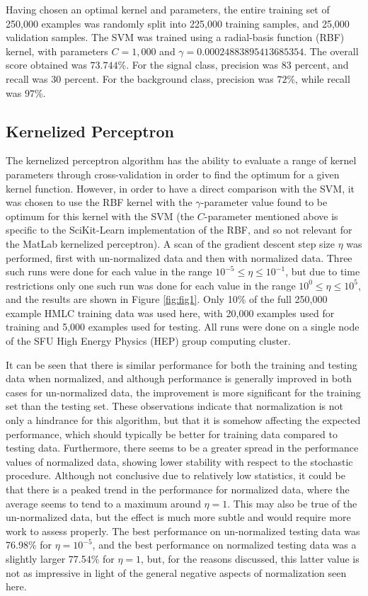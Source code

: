 \documentclass          {article} %
\begin{document}
Having chosen an optimal kernel and parameters, the entire training set of 250,000 examples was randomly split into 225,000 training samples, and 25,000 validation samples. The SVM was trained using a radial-basis function (RBF) kernel, with parameters $C=1,000$ and $\gamma=0.00024883895413685354$. The overall score obtained was $73.744$\%. For the signal class, precision was $83$ percent, and recall was $30$ percent. For the background class, precision was $72$\%, while recall was $97$\%.

            \subsection {Kernelized Perceptron}
            \label      {kernelized_perceptron}
The kernelized perceptron algorithm has the ability to evaluate a range of kernel parameters through cross-validation in order to find the optimum for a given kernel function. However, in order to have a direct comparison with the SVM, it was chosen to use the RBF kernel with the $\gamma$-parameter value found to be optimum for this kernel with the SVM (the $C$-parameter mentioned above is specific to the SciKit-Learn implementation of the RBF, and so not relevant for the MatLab kernelized perceptron). A scan of the gradient descent step size $\eta$ was performed, first with un-normalized data and then with normalized data. Three such runs were done for each value in the range $10^{-5}\le\eta\le10^{-1}$, but due to time restrictions only one such run was done for each value in the range $10^{0}\le\eta\le10^{5}$, and the results are shown in Figure \ref{fig:fig1}. Only 10\% of the full 250,000 example HMLC training data was used here, with 20,000 examples used for training and 5,000 examples used for testing. All runs were done on a single node of the SFU High Energy Physics (HEP) group computing cluster.

It can be seen that there is similar performance for both the training and testing data when normalized, and although performance is generally improved in both cases for un-normalized data, the improvement is more significant for the training set than the testing set. These observations indicate that normalization is not only a hindrance for this algorithm, but that it is somehow affecting the expected performance, which should typically be better for training data compared to testing data. Furthermore, there seems to be a greater spread in the performance values of normalized data, showing lower stability with respect to the stochastic procedure. Although not conclusive due to relatively low statistics, it could be that there is a peaked trend in the performance for normalized data, where the average seems to tend to a maximum around $\eta=1$. This may also be true of the un-normalized data, but the effect is much more subtle and would require more work to assess properly. The best performance on un-normalized testing data was 76.98\% for $\eta=10^{-5}$, and the best performance on normalized testing data was a slightly larger 77.54\% for $\eta=1$, but, for the reasons discussed, this latter value is not as impressive in light of the general negative aspects of normalization seen here.
\end{document}
